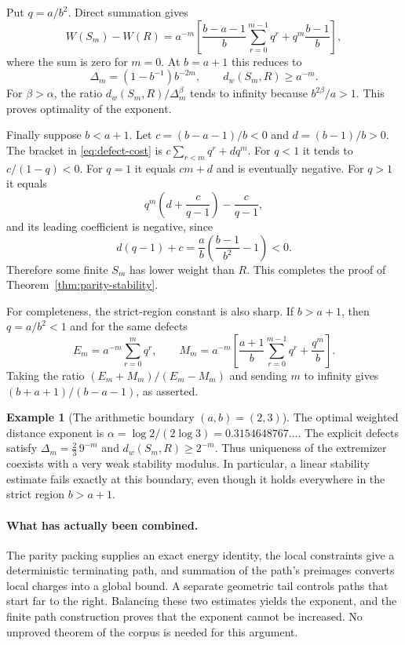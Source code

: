 \documentclass[11pt,a4paper]{article}
\theoremstyle{definition}
\newtheorem{example}[theorem]{Example}
\theoremstyle{remark}\newtheorem{remark}[theorem]{Remark}
\begin{document}
Put $q=a/b^2$. Direct summation gives
\begin{equation}\label{eq:defect-cost}
 W(S_m)-W(R)
 =a^{-m}\left[
 \frac{b-a-1}{b}\sum_{r=0}^{m-1}q^r
       +q^m\frac{b-1}{b}\right],
\end{equation}
where the sum is zero for $m=0$.
At $b=a+1$ this reduces to
\[
 \Delta_m=(1-b^{-1})b^{-2m},\qquad
 d_w(S_m,R)\ge a^{-m}.
\]
For $\beta>\alpha$, the ratio
$d_w(S_m,R)/\Delta_m^\beta$ tends to infinity because
$b^{2\beta}/a>1$. This proves optimality of the exponent.

Finally suppose $b<a+1$. Let $c=(b-a-1)/b<0$ and $d=(b-1)/b>0$.
The bracket in \eqref{eq:defect-cost} is
$c\sum_{r<m}q^r+dq^m$. For $q<1$ it tends to $c/(1-q)<0$.
For $q=1$ it equals $cm+d$ and is eventually negative.
For $q>1$ it equals
\[
 q^m\left(d+\frac{c}{q-1}\right)-\frac{c}{q-1},
\]
and its leading coefficient is negative, since
\[
 d(q-1)+c=\frac{a}{b}\left(\frac{b-1}{b^2}-1\right)<0.
\]
Therefore some finite $S_m$ has lower weight than $R$.
This completes the proof of Theorem~\ref{thm:parity-stability}.

For completeness, the strict-region constant is also sharp. If $b>a+1$,
then $q=a/b^2<1$ and for the same defects
\[
 E_m=a^{-m}\sum_{r=0}^{m}q^r,\qquad
 M_m=a^{-m}\left[\frac{a+1}{b}\sum_{r=0}^{m-1}q^r
                       +\frac{q^m}{b}\right].
\]
Taking the ratio $(E_m+M_m)/(E_m-M_m)$ and sending $m$ to infinity gives
$(b+a+1)/(b-a-1)$, as asserted.

\begin{example}[The arithmetic boundary $(a,b)=(2,3)$]
The optimal weighted distance exponent is
$\alpha=\log2/(2\log3)=0.3154648767\ldots$.
The explicit defects satisfy
$\Delta_m=\frac23\,9^{-m}$ and
$d_w(S_m,R)\ge2^{-m}$. Thus uniqueness of the extremizer coexists
with a very weak stability modulus. In particular, a linear stability
estimate fails exactly at this boundary, even though it holds everywhere
in the strict region $b>a+1$.
\end{example}

\paragraph{What has actually been combined.}
The parity packing supplies an exact energy identity, the local constraints
give a deterministic terminating path, and summation of the path's
preimages converts local charges into a global bound. A separate geometric
tail controls paths that start far to the right. Balancing these two
estimates yields the exponent, and the finite path construction proves
that the exponent cannot be increased. No unproved theorem of the corpus
is needed for this argument.
\end{document}
